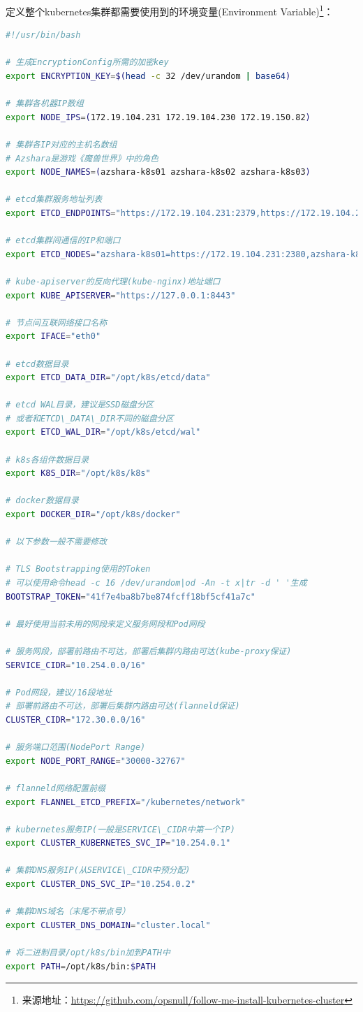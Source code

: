 \documentclass[8pt]{book}
\numberwithin{dummy}{section}
\theoremstyle{ocrenumbox}
\theoremstyle{blacknumex}
\theoremstyle{blacknumbox}
\theoremstyle{ocrenum}
\begin{document}
定义整个kubernetes集群都需要使用到的环境变量(Environment Variable)\footnote{来源地址：\url{https://github.com/opsnull/follow-me-install-kubernetes-cluster}}：

\begin{lstlisting}[language=Bash]
#!/usr/bin/bash

# 生成EncryptionConfig所需的加密key
export ENCRYPTION_KEY=$(head -c 32 /dev/urandom | base64)

# 集群各机器IP数组
export NODE_IPS=(172.19.104.231 172.19.104.230 172.19.150.82)

# 集群各IP对应的主机名数组
# Azshara是游戏《魔兽世界》中的角色
export NODE_NAMES=(azshara-k8s01 azshara-k8s02 azshara-k8s03)

# etcd集群服务地址列表
export ETCD_ENDPOINTS="https://172.19.104.231:2379,https://172.19.104.230:2379,https://172.19.150.82:2379"

# etcd集群间通信的IP和端口
export ETCD_NODES="azshara-k8s01=https://172.19.104.231:2380,azshara-k8s02=https://172.19.104.230:2380,azshara-k8s03=https://172.19.150.82:2380"

# kube-apiserver的反向代理(kube-nginx)地址端口
export KUBE_APISERVER="https://127.0.0.1:8443"

# 节点间互联网络接口名称
export IFACE="eth0"

# etcd数据目录
export ETCD_DATA_DIR="/opt/k8s/etcd/data"

# etcd WAL目录，建议是SSD磁盘分区
# 或者和ETCD\_DATA\_DIR不同的磁盘分区
export ETCD_WAL_DIR="/opt/k8s/etcd/wal"

# k8s各组件数据目录
export K8S_DIR="/opt/k8s/k8s"

# docker数据目录
export DOCKER_DIR="/opt/k8s/docker"

# 以下参数一般不需要修改

# TLS Bootstrapping使用的Token
# 可以使用命令head -c 16 /dev/urandom|od -An -t x|tr -d ' '生成
BOOTSTRAP_TOKEN="41f7e4ba8b7be874fcff18bf5cf41a7c"

# 最好使用当前未用的网段来定义服务网段和Pod网段

# 服务网段，部署前路由不可达，部署后集群内路由可达(kube-proxy保证)
SERVICE_CIDR="10.254.0.0/16"

# Pod网段，建议/16段地址
# 部署前路由不可达，部署后集群内路由可达(flanneld保证)
CLUSTER_CIDR="172.30.0.0/16"

# 服务端口范围(NodePort Range)
export NODE_PORT_RANGE="30000-32767"

# flanneld网络配置前缀
export FLANNEL_ETCD_PREFIX="/kubernetes/network"

# kubernetes服务IP(一般是SERVICE\_CIDR中第一个IP)
export CLUSTER_KUBERNETES_SVC_IP="10.254.0.1"

# 集群DNS服务IP(从SERVICE\_CIDR中预分配)
export CLUSTER_DNS_SVC_IP="10.254.0.2"

# 集群DNS域名（末尾不带点号）
export CLUSTER_DNS_DOMAIN="cluster.local"

# 将二进制目录/opt/k8s/bin加到PATH中
export PATH=/opt/k8s/bin:$PATH
\end{lstlisting}
\end{document}
